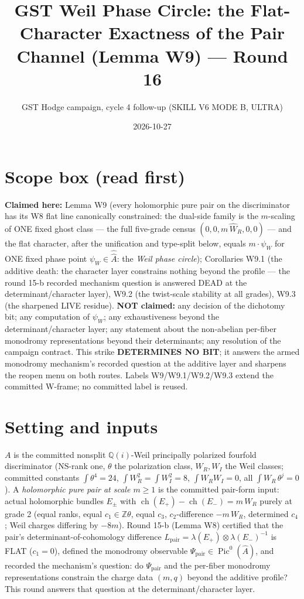 \documentclass[11pt]{article}
\title{GST Weil Phase Circle: the Flat-Character Exactness of the Pair Channel
(Lemma W9) --- Round 16}
\author{GST Hodge campaign, cycle 4 follow-up (SKILL V6 MODE B, ULTRA)}
\date{2026-10-27}
\newcommand{\WR}{W_R}
\newcommand{\WI}{W_I}
\newcommand{\ch}{\operatorname{ch}}
\newcommand{\Pic}{\operatorname{Pic}}
\newcommand{\KA}{A}
\newcommand{\KAd}{\widehat{A}}
\begin{document}
\maketitle

\section*{Scope box (read first)}

\textbf{Claimed here:} Lemma W9 (every holomorphic pure pair on the
discriminator has its W8 flat line canonically constrained: the dual-side
family is the $m$-scaling of ONE fixed ghost class --- the full five-grade
census $(0,0,m\,\widehat\WR,0,0)$ --- and the flat character, after the
unification and type-split below, equals $m\cdot\psi_W$ for ONE fixed phase
point $\psi_W \in \widehat{\KAd}$: the \emph{Weil phase circle}); Corollaries
W9.1 (the additive death: the character layer constrains nothing beyond the
profile --- the round 15-b recorded mechanism question is answered DEAD at the
determinant/character layer), W9.2 (the twist-scale stability at all grades),
W9.3 (the sharpened LIVE residue). \textbf{NOT claimed:} any decision of the
dichotomy bit; any computation of $\psi_W$; any exhaustiveness beyond the
determinant/character layer; any statement about the non-abelian per-fiber
monodromy representations beyond their determinants; any resolution of the
campaign contract. This strike \textbf{DETERMINES NO BIT}; it answers the
armed monodromy mechanism's recorded question at the additive layer and
sharpens the reopen menu on both routes. Labels W9/W9.1/W9.2/W9.3 extend the
committed W-frame; no committed label is reused.

\section{Setting and inputs}

$\KA$ is the committed nonsplit $\mathbb{Q}(i)$-Weil principally polarized
fourfold discriminator (NS-rank one, $\theta$ the polarization class,
$\WR,\WI$ the Weil classes; committed constants
$\int\theta^4=24$, $\int \WR^2 = \int \WI^2 = 8$, $\int \WR\WI = 0$, all
$\int \WR\,\theta^j = 0$). A \emph{holomorphic pure pair at scale $m\ge 1$}
is the committed pair-form input: actual holomorphic bundles $E_\pm$ with
$\ch(E_+) - \ch(E_-) = m\,\WR$ purely at grade 2 (equal ranks, equal
$c_1\in\mathbb{Z}\theta$, equal $c_3$, $c_2$-difference $-m\,\WR$,
determined $c_4$; Weil charges differing by $-8m$). Round 15-b (Lemma W8)
certified that the pair's determinant-of-cohomology difference
$L_{\mathrm{pair}} = \lambda(E_+)\otimes\lambda(E_-)^{-1}$ is FLAT
($c_1 = 0$), defined the monodromy observable $\Psi_{\mathrm{pair}} \in
\Pic^0(\KAd)$, and recorded the mechanism's question: do
$\Psi_{\mathrm{pair}}$ and the per-fiber monodromy representations constrain
the charge data $(m,q)$ beyond the additive profile? This round answers that
question at the determinant/character layer.
\end{document}

